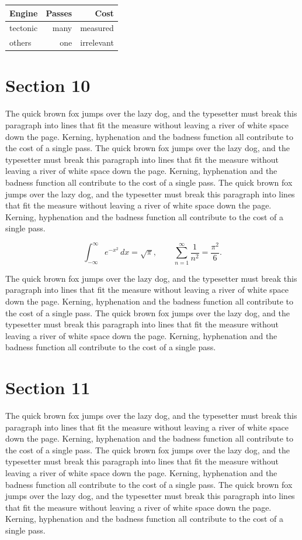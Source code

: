 \documentclass{article}
\begin{document}
\begin{center}
\begin{tabular}{lrr}
\toprule
Engine & Passes & Cost \\
\midrule
tectonic & many & measured \\
others & one & irrelevant \\
\bottomrule
\end{tabular}
\end{center}

\section{Section 10}
The quick brown fox jumps over the lazy dog, and the typesetter must break this paragraph into lines that fit the measure without leaving a river of white space down the page. Kerning, hyphenation and the badness function all contribute to the cost of a single pass. The quick brown fox jumps over the lazy dog, and the typesetter must break this paragraph into lines that fit the measure without leaving a river of white space down the page. Kerning, hyphenation and the badness function all contribute to the cost of a single pass. The quick brown fox jumps over the lazy dog, and the typesetter must break this paragraph into lines that fit the measure without leaving a river of white space down the page. Kerning, hyphenation and the badness function all contribute to the cost of a single pass. 

\begin{equation}
\int_{-\infty}^{\infty} e^{-x^{2}}\,dx = \sqrt{\pi}, \qquad
\sum_{n=1}^{\infty} \frac{1}{n^{2}} = \frac{\pi^{2}}{6}.
\end{equation}

The quick brown fox jumps over the lazy dog, and the typesetter must break this paragraph into lines that fit the measure without leaving a river of white space down the page. Kerning, hyphenation and the badness function all contribute to the cost of a single pass. The quick brown fox jumps over the lazy dog, and the typesetter must break this paragraph into lines that fit the measure without leaving a river of white space down the page. Kerning, hyphenation and the badness function all contribute to the cost of a single pass. 
\section{Section 11}
The quick brown fox jumps over the lazy dog, and the typesetter must break this paragraph into lines that fit the measure without leaving a river of white space down the page. Kerning, hyphenation and the badness function all contribute to the cost of a single pass. The quick brown fox jumps over the lazy dog, and the typesetter must break this paragraph into lines that fit the measure without leaving a river of white space down the page. Kerning, hyphenation and the badness function all contribute to the cost of a single pass. The quick brown fox jumps over the lazy dog, and the typesetter must break this paragraph into lines that fit the measure without leaving a river of white space down the page. Kerning, hyphenation and the badness function all contribute to the cost of a single pass. 
\end{document}

